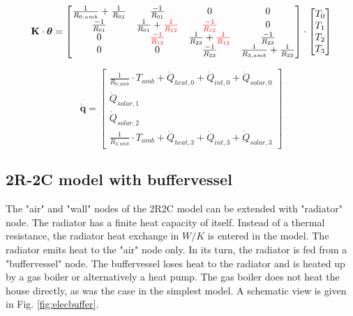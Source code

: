 \begin{equation}
	\mathbf{K} \cdot \boldsymbol{\theta} =
	\begin{bmatrix}
		\frac{1}{R_{0, amb}} + \frac{1}{R_{01}} & \frac{-1}{R_{01}} & 0 & 0 \\
		\frac{-1}{R_{01}} &  \frac{1}{R_{01}} + \color{red}\frac{1}{R_{12}} & \color{red}\frac{-1}{R_{12}} & 0 \\
		0 & \color{red} \frac{-1}{R_{12}} & \frac{1}{R_{23}} + \color{red}\frac{1}{R_{12}}   & \frac{-1}{R_{23}}\\
		0 & 0 & \frac{-1}{R_{23}} &  \frac{1}{R_{3, amb}} + \frac{1}{R_{23}} \\
	\end{bmatrix}
	\cdot
	\begin{bmatrix}
		T_{0} \\
		T_{1} \\
		T_{2} \\
		T_{3}
	\end{bmatrix}
\end{equation}

\begin{equation}
	\mathbf{\dot{q}} =
	\begin{bmatrix}
		\frac{1}{R_{0, amb}} \cdot T_{amb} + \dot{Q}_{heat, 0} + \dot{Q}_{int, 0} + \dot{Q}_{solar, 0} \\
		\dot{Q}_{solar, 1} \\
		\dot{Q}_{solar, 2} \\
		\frac{1}{R_{3, amb}} \cdot T_{amb} + \dot{Q}_{heat, 3} + \dot{Q}_{int, 3} + \dot{Q}_{solar, 3}
	\end{bmatrix}
\end{equation}
		
\subsection{2R-2C model with buffervessel}

The "air" and "wall" nodes of the 2R2C model can be extended with "radiator" node. The radiator has a finite heat capacity of itself. Instead of a thermal resistance, the radiator heat exchange in $W/K$ is entered in the model. The radiator emits heat to the "air" node only. In its turn, the radiator is fed from a "buffervessel" node. The buffervessel loses heat to the radiator and is heated up by a gas boiler or alternatively a heat pump. The gas boiler does not heat the house directly, as was the case in the simplest model. A schematic view is given in Fig. \ref{fig:elecbuffer}.

